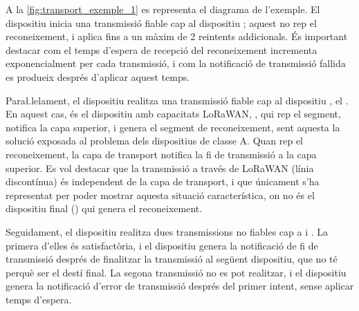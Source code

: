 \documentclass{tfgitic}[2024/07/01]
\begin{document}
{A la \autoref{fig:transport_exemple_1} es representa el diagrama de l'exemple. El dispositiu  inicia una transmissió fiable cap al dispositiu ; aquest no rep el reconeixement, i aplica fins a un màxim de 2 reintents addicionals. És important destacar com el temps d'espera de recepció del reconeixement incrementa exponencialment per cada transmissió, i com la notificació de transmissió fallida es produeix després d'aplicar aquest temps. 

Para\l.lelament, el dispositiu  realitza una transmissió fiable cap al dispositiu , el . En aquest cas, és el dispositiu amb capacitats LoRaWAN, , qui rep el segment, notifica la capa superior, i genera el segment de reconeixement, sent aquesta la solució exposada al problema dels dispositius de classe A. Quan  rep el reconeixement, la capa de transport notifica la fi de transmissió a la capa superior.
Es vol destacar que la transmissió a través de LoRaWAN (línia discontínua) és independent de la capa de transport, i que únicament s'ha representat per poder mostrar aquesta situació característica, on no és el dispositiu final () qui genera el reconeixement.

Seguidament, el dispositiu  realitza dues transmissions no fiables cap a  i . La primera d'elles és satisfactòria, i el dispositiu genera la notificació de fi de transmissió després de finalitzar la transmissió al següent dispositiu, que no té perquè ser el destí final. La segona transmissió no es pot realitzar, i el dispositiu genera la notificació d'error de transmissió després del primer intent, sense aplicar temps d'espera.

\begin{figure}[h]
    \centering
\end{figure}}
\end{document}
